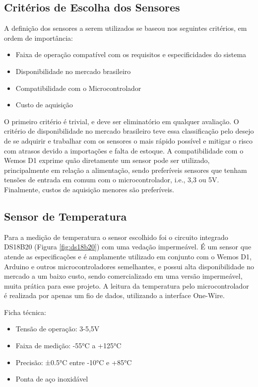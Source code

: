 \subsection{Critérios de Escolha dos Sensores}

A definição dos sensores a serem utilizados se baseou nos seguintes critérios, em ordem de importância:

\begin{itemize}
    \item Faixa de operação compatível com os requisitos e especificidades do sistema
    \item Disponibilidade no mercado brasileiro
    \item Compatibilidade com o Microcontrolador
    \item Custo de aquisição
\end{itemize}

O primeiro critério é trivial, e deve ser eliminatório em qualquer avaliação. O critério de disponibilidade no mercado brasileiro teve essa classificação pelo desejo de se adquirir e trabalhar com os sensores o mais rápido possível e mitigar o risco com atrasos devido a importações e falta de estoque. A compatibilidade com o Wemos D1 exprime quão diretamente um sensor pode ser utilizado, principalmente em relação a alimentação, sendo preferíveis sensores que tenham tensões de entrada em comum com o microcontrolador, i.e., 3,3 ou 5V. Finalmente, custos de aquisição menores são preferíveis.

\subsection{Sensor de Temperatura}

Para a medição de temperatura o sensor escolhido foi o circuito integrado DS18B20 (Figura \ref{fig:ds18b20}) com uma vedação impermeável. É um sensor que atende as especificações e é amplamente utilizado em conjunto com o Wemos D1, Arduino e outros microcontroladores semelhantes, e possui alta disponibilidade no mercado a um baixo custo, sendo comercializado em uma versão impermeável, muita prática para esse projeto. A leitura da temperatura pelo microcontrolador é realizada por apenas um fio de dados, utilizando a interface One-Wire. 

Ficha técnica:
\begin{itemize}
    \item Tensão de operação: 3-5,5V
    \item Faixa de medição: -55°C a +125°C
    \item Precisão: ±0.5°C entre -10°C e +85°C
    \item Ponta de aço inoxidável
\end{itemize}

